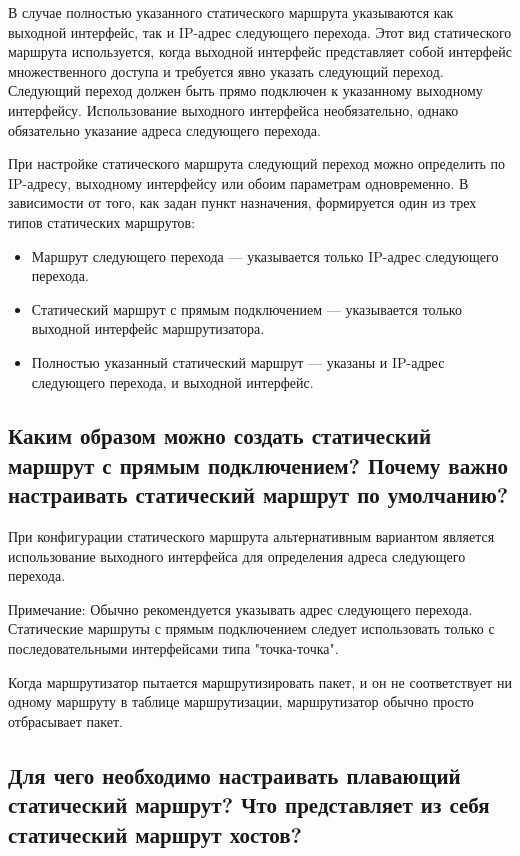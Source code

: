 В случае полностью указанного статического маршрута указываются
как выходной интерфейс, так и IP-адрес следующего перехода.
Этот вид статического маршрута используется,
когда выходной интерфейс представляет собой интерфейс множественного доступа
и требуется явно указать следующий переход.
Следующий переход должен быть прямо подключен
к указанному выходному интерфейсу.
Использование выходного интерфейса необязательно, однако
обязательно указание адреса следующего перехода.\par
При настройке статического маршрута следующий переход можно определить
по IP-адресу, выходному интерфейсу или обоим параметрам одновременно.
В зависимости от того, как задан пункт назначения,
формируется один из трех типов статических маршрутов:

\begin{itemize}
    \item Маршрут следующего перехода --- указывается только IP-адрес
    следующего перехода.
    \item Статический маршрут с прямым подключением --- указывается
    только выходной интерфейс маршрутизатора.
    \item Полностью указанный статический маршрут --- указаны и IP-адрес
    следующего перехода, и выходной интерфейс.
\end{itemize}

\subsection{Каким образом можно создать статический маршрут
с прямым подключением?
Почему важно настраивать статический маршрут по умолчанию?}

При конфигурации статического маршрута альтернативным вариантом
является использование выходного интерфейса для определения адреса
следующего перехода.\par
Примечание: Обычно рекомендуется указывать адрес следующего перехода.
Статические маршруты с прямым подключением следует использовать только
с последовательными интерфейсами типа "точка-точка".\par
Когда маршрутизатор пытается маршрутизировать пакет,
и он не соответствует ни одному маршруту в таблице маршрутизации,
маршрутизатор обычно просто отбрасывает пакет.

\subsection{Для чего необходимо настраивать плавающий статический маршрут?
Что представляет из себя статический маршрут хостов?}

